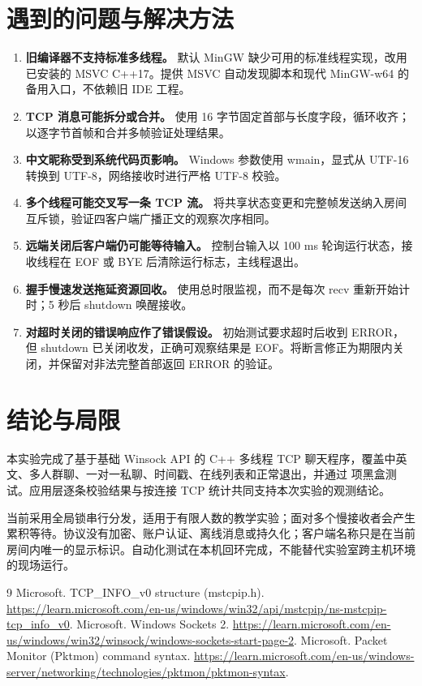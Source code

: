 \documentclass[UTF8,notitlepage,11pt]{ctexart}
\begin{document}
\section{遇到的问题与解决方法}
\begin{enumerate}
\item \textbf{旧编译器不支持标准多线程。} 默认 MinGW 缺少可用的标准线程实现，改用已安装的 MSVC C++17。提供 MSVC 自动发现脚本和现代 MinGW-w64 的备用入口，不依赖旧 IDE 工程。
\item \textbf{TCP 消息可能拆分或合并。} 使用 16 字节固定首部与长度字段，循环收齐；以逐字节首帧和合并多帧验证处理结果。
\item \textbf{中文昵称受到系统代码页影响。} Windows 参数使用 wmain，显式从 UTF-16 转换到 UTF-8，网络接收时进行严格 UTF-8 校验。
\item \textbf{多个线程可能交叉写一条 TCP 流。} 将共享状态变更和完整帧发送纳入房间互斥锁，验证四客户端广播正文的观察次序相同。
\item \textbf{远端关闭后客户端仍可能等待输入。} 控制台输入以 100 ms 轮询运行状态，接收线程在 EOF 或 BYE 后清除运行标志，主线程退出。
\item \textbf{握手慢速发送拖延资源回收。} 使用总时限监视，而不是每次 recv 重新开始计时；5 秒后 shutdown 唤醒接收。
\item \textbf{对超时关闭的错误响应作了错误假设。} 初始测试要求超时后收到 ERROR，但 shutdown 已关闭收发，正确可观察结果是 EOF。将断言修正为期限内关闭，并保留对非法完整首部返回 ERROR 的验证。
\end{enumerate}

\section{结论与局限}
本实验完成了基于基础 Winsock API 的 C++ 多线程 TCP 聊天程序，覆盖中英文、多人群聊、一对一私聊、时间戳、在线列表和正常退出，并通过 \TestCount{} 项黑盒测试。应用层逐条校验结果与按连接 TCP 统计共同支持本次实验的观测结论。

当前采用全局锁串行分发，适用于有限人数的教学实验；面对多个慢接收者会产生累积等待。协议没有加密、账户认证、离线消息或持久化；客户端名称只是在当前房间内唯一的显示标识。自动化测试在本机回环完成，不能替代实验室跨主机环境的现场运行。

\clearpage
{}
\begin{thebibliography}{9}
 Microsoft. TCP\_INFO\_v0 structure (mstcpip.h).
\url{https://learn.microsoft.com/en-us/windows/win32/api/mstcpip/ns-mstcpip-tcp_info_v0}.
 Microsoft. Windows Sockets 2.
\url{https://learn.microsoft.com/en-us/windows/win32/winsock/windows-sockets-start-page-2}.
 Microsoft. Packet Monitor (Pktmon) command syntax.
\url{https://learn.microsoft.com/en-us/windows-server/networking/technologies/pktmon/pktmon-syntax}.
\end{thebibliography}
\end{document}
